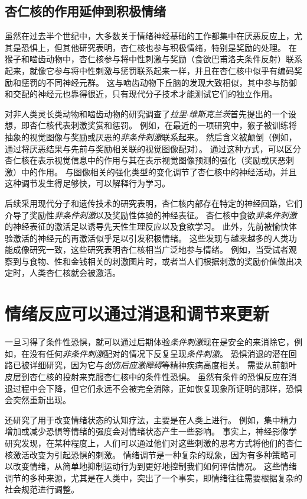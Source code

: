 \subsection{杏仁核的作用延伸到积极情绪}

虽然在过去半个世纪中，大多数关于情绪神经基础的工作都集中在厌恶反应上，尤其是恐惧上，但其他研究表明，杏仁核也参与积极情绪，特别是奖励的处理。
在猴子和啮齿动物中，杏仁核参与将中性刺激与奖励（食欲巴甫洛夫条件反射）联系起来，就像它参与将中性刺激与惩罚联系起来一样，并且在杏仁核中似乎有编码奖励和惩罚的不同神经元群。
这与啮齿动物下丘脑的发现大致相似，其中参与防御和交配的神经元也靠得很近，只有现代分子技术才能测试它们的独立作用。


对非人类灵长类动物和啮齿动物的研究调查了\textit{拉里$\cdot$维斯克兰茨}首先提出的一个设想，即杏仁核代表刺激奖赏和惩罚。
例如，在最近的一项研究中，猴子被训练将抽象的视觉图像与奖励或厌恶的\textit{非条件刺激}联系起来。
然后含义被颠倒（例如，通过将厌恶结果与先前与奖励相关联的视觉图像配对）。
通过这种方式，可以区分杏仁核在表示视觉信息中的作用与其在表示视觉图像预测的强化（奖励或厌恶刺激）中的作用。
与图像相关的强化类型的变化调节了杏仁核中的神经活动，并且这种调节发生得足够快，可以解释行为学习。


后续采用现代分子和遗传技术的研究表明，杏仁核内部存在特定的神经回路，它们介导了奖励性\textit{非条件刺激}以及奖励性体验的神经表征。
杏仁核中食欲\textit{非条件刺激}的神经表征的激活足以诱导先天性生理反应以及食欲学习。
此外，先前被愉快体验激活的神经元的再激活似乎足以引发积极情绪。
这些发现与越来越多的人类功能成像研究一致，这些研究表明杏仁核相当广泛地参与情绪。
例如，当受试者观察到与食物、性和金钱相关的刺激图片时，或者当人们根据刺激的奖励价值做出决定时，人类杏仁核就会被激活。



\section{情绪反应可以通过消退和调节来更新}

一旦习得了条件性恐惧，就可以通过后期体验\textit{条件刺激}现在是安全的来消除它，例如，在没有任何\textit{非条件刺激}配对的情况下反复呈现\textit{条件刺激}。
恐惧消退的潜在回路已被详细研究，因为它与\textit{创伤后应激障碍}等精神疾病高度相关。
需要从前额叶皮层到杏仁核的投射来克服杏仁核中的条件性恐惧。
虽然有条件的恐惧反应在消退过程中会下降，但它们永远不会被完全消除，正如恢复现象所证明的那样，恐惧会突然重新出现。


还研究了用于改变情绪状态的认知疗法，主要是在人类上进行。
例如，集中精力增加或减少恐惧等情绪的强度会对情绪状态产生一些影响。
事实上，神经影像学研究发现，在某种程度上，人们可以通过他们对这些刺激的思考方式将他们的杏仁核激活改变为引起恐惧的刺激。
情绪调节是一种复杂的现象，因为有多种策略可以改变情绪，从简单地抑制运动行为到更好地控制我们如何评估情况。
这些情绪调节的多种来源，尤其是在人类中，突出了一个事实，即情绪往往需要根据复杂的社会规范进行调整。



